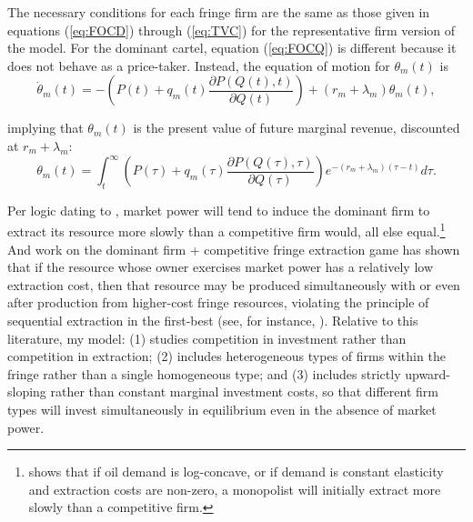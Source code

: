 \documentclass[12pt]{article}
\begin{document}
The necessary conditions for each fringe firm are the same as those given in equations (\ref{eq:FOCD}) through (\ref{eq:TVC}) for the representative firm version of the model. For the dominant cartel, equation (\ref{eq:FOCQ}) is different because it does not behave as a price-taker. Instead, the equation of motion for $\theta_m(t)$ is
\begin{equation}
\dot{\theta}_m(t) = -\left(P(t)+q_m(t)\frac{\partial P(Q(t),t)}{\partial Q(t)}\right) + (r_m+\lambda_m)\theta_m(t), \label{eq:FOCQm}
\end{equation}

\noindent implying that $\theta_m(t)$ is the present value of future marginal revenue, discounted at $r_m+\lambda_m$:
\begin{equation}
\theta_m(t) = \int_{t}^{\infty}\left(P(\tau)+q_m(\tau)\frac{\partial P(Q(\tau),\tau)}{\partial Q(\tau)}\right)e^{-(r_m+\lambda_m)(\tau-t)}d\tau.
\label{eq:thetam}
\end{equation}

Per logic dating to \cite{stiglitz1976}, market power will tend to induce the dominant firm to extract its resource more slowly than a competitive firm would, all else equal.\footnote{\cite{stiglitz1976} shows that if oil demand is log-concave, or if demand is constant elasticity and extraction costs are non-zero, a monopolist will initially extract more slowly than a competitive firm.} And work on the dominant firm + competitive fringe extraction game has shown that if the resource whose owner exercises market power has a relatively low extraction cost, then that resource may be produced simultaneously with or even after production from higher-cost fringe resources, violating the \cite{Herfindahl1967} principle of sequential extraction in the first-best (see, for instance, \cite{benchekrounetal2020}). Relative to this literature, my model: (1) studies competition in investment rather than competition in extraction; (2) includes heterogeneous types of firms within the fringe rather than a single homogeneous type; and (3) includes strictly upward-sloping rather than constant marginal investment costs, so that different firm types will invest simultaneously in equilibrium even in the absence of market power.
\end{document}
